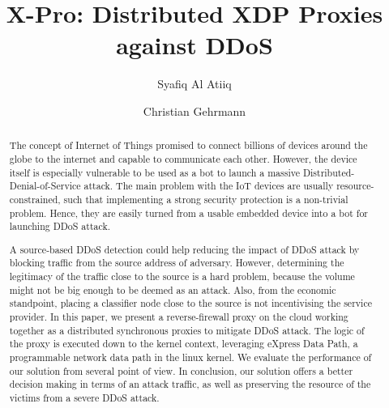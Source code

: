 \documentclass[sigplan,screen]{acmart}
\begin{document}
\title{X-Pro: Distributed XDP Proxies against DDoS}

\author{Syafiq Al Atiiq}
\author{Christian Gehrmann}

\begin{abstract}
The concept of Internet of Things promised to connect billions of devices around the globe to the internet and capable to communicate each other. However, the device itself is especially vulnerable to be used as a bot to launch a massive Distributed-Denial-of-Service attack. The main problem with the IoT devices are usually resource-constrained, such that implementing a strong security protection is a non-trivial problem. Hence, they are easily turned from a usable embedded device into a bot for launching DDoS attack. 

A source-based DDoS detection could help reducing the impact of DDoS attack by blocking traffic from the source address of adversary. However, determining the legitimacy of the traffic close to the source is a hard problem, because the volume might not be big enough to be deemed as an attack. Also, from the economic standpoint, placing a classifier node close to the source is not incentivising the service provider. In this paper, we present a reverse-firewall proxy on the cloud working together as a distributed synchronous proxies to mitigate DDoS attack. The logic of the proxy is executed down to the kernel context, leveraging eXpress Data Path, a programmable network data path in the linux kernel. We evaluate the performance of our solution from several point of view. In conclusion, our solution offers a better decision making in terms of an attack traffic, as well as preserving the resource of the victims from a severe DDoS attack.  
\end{abstract}
\end{document}
